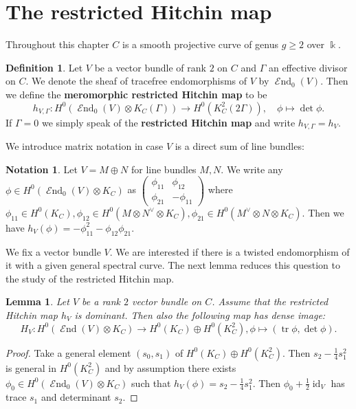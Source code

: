 \documentclass[12pt]{extarticle}
\newtheorem{lemma}[theorem]{Lemma}
\theoremstyle{definition}
\newtheorem{definition}[theorem]{Definition}
\newtheorem{notation}[theorem]{Notation}
\numberwithin{theorem}{section}
\newcommand{\op}{\operatorname}
\DeclareMathOperator{\End}{\mathcal{E}nd}
\begin{document}
\section{The restricted Hitchin map}
\label{section:restricted_hitchin}
Throughout this chapter $C$ is a smooth projective curve of genus $g \geq 2$ over $\Bbbk$.
\begin{definition}
Let $V$ be a vector bundle of rank $2$ on $C$ and $\Gamma$ an effective divisor on $C$. We denote the sheaf of tracefree endomorphisms of $V$ by $\End_0(V)$. Then we define the \textbf{meromorphic restricted Hitchin map} to be 
\begin{equation*}
h_{V,\Gamma}: H^0(\End_0(V)\otimes K_C(\Gamma)) \to H^0(K_C^2(2\Gamma)),\quad\phi\mapsto \det \phi.
\end{equation*} 
If $\Gamma = 0$ we simply speak of the \textbf{restricted Hitchin map} and write $h_{V,\Gamma} = h_V$.
\end{definition}
We introduce matrix notation in case $V$ is a direct sum of line bundles:
\begin{notation}
Let $V=M \oplus N$ for line bundles $M,N$. We write any $\phi \in H^0(\End_0(V)\otimes K_C)$ as $\begin{pmatrix}
\phi_{11} & \phi_{12}\\
\phi_{21} & -\phi_{11}
\end{pmatrix}$ where $\phi_{11}\in H^0(K_C),\phi_{12}\in H^0(M\otimes N^\vee\otimes K_C), \phi_{21} \in H^0(M^\vee\otimes N\otimes K_C)$. Then we have $h_V(\phi) = -\phi_{11}^2 - \phi_{12}\phi_{21}$.
\end{notation}
We fix a vector bundle $V$. We are interested if there is a twisted endomorphism of it with a given general spectral curve. The next lemma reduces this question to the study of the restricted Hitchin map.
\begin{lemma}
Let $V$ be a rank $2$ vector bundle on $C$. Assume that the restricted Hitchin map $h_V$ is dominant. Then also the following map has dense image:
\begin{equation*}
H_V: H^0(\End(V)\otimes K_C) \to H^0(K_C) \oplus H^0(K_C^2), \phi \mapsto (\op{tr} \phi,\det\phi).
\end{equation*} 
\end{lemma}
\begin{proof}
Take a general element $(s_0,s_1)$ of $H^0(K_C)\oplus H^0(K_C^2)$. Then $s_2 - \frac{1}{4}s_1^2$ is general in $H^0(K_C^2)$ and by assumption there exists $\phi_0 \in H^0(\End_0(V)\otimes K_C)$ such that $h_V(\phi) = s_2 - \frac{1}{4}s_1^2$. Then $\phi_0 + \frac{1}{2}\op{id}_V$ has trace $s_1$ and determinant $s_2$.
\end{proof}
\end{document}
